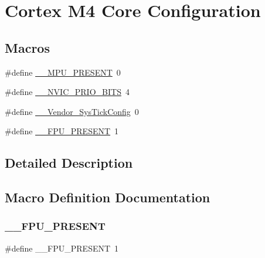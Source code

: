 \hypertarget{group___cortex___core___configuration}{}\section{Cortex M4 Core Configuration}
\label{group___cortex___core___configuration}
\subsection*{Macros}
\begin{DoxyCompactItemize}
\item 
\#define \mbox{\hyperlink{group___cortex___core___configuration_ga4127d1b31aaf336fab3d7329d117f448}{\+\_\+\+\_\+\+M\+P\+U\+\_\+\+P\+R\+E\+S\+E\+NT}}~0
\item 
\#define \mbox{\hyperlink{group___cortex___core___configuration_gae3fe3587d5100c787e02102ce3944460}{\+\_\+\+\_\+\+N\+V\+I\+C\+\_\+\+P\+R\+I\+O\+\_\+\+B\+I\+TS}}~4
\item 
\#define \mbox{\hyperlink{group___cortex___core___configuration_gab58771b4ec03f9bdddc84770f7c95c68}{\+\_\+\+\_\+\+Vendor\+\_\+\+Sys\+Tick\+Config}}~0
\item 
\#define \mbox{\hyperlink{group___cortex___core___configuration_gac1ba8a48ca926bddc88be9bfd7d42641}{\+\_\+\+\_\+\+F\+P\+U\+\_\+\+P\+R\+E\+S\+E\+NT}}~1
\end{DoxyCompactItemize}


\subsection{Detailed Description}


\subsection{Macro Definition Documentation}
\mbox{\label{group___cortex___core___configuration_gac1ba8a48ca926bddc88be9bfd7d42641}} 
\subsubsection{\texorpdfstring{\+\_\+\+\_\+\+F\+P\+U\+\_\+\+P\+R\+E\+S\+E\+NT}{\_\_FPU\_PRESENT}}
{\footnotesize\ttfamily \#define \+\_\+\+\_\+\+F\+P\+U\+\_\+\+P\+R\+E\+S\+E\+NT~1}

